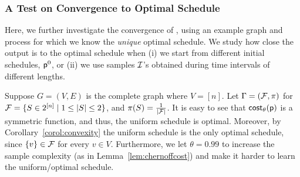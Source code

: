 \begin{table}[ht]
\centering
{}
\end{table}



\subsubsection{A Test on Convergence to  Optimal Schedule}\label{sec:example}
Here, we further investigate the convergence of \algonameapx, using an example
graph and process for which we know the \emph{unique} optimal schedule. We study
how close the \algonameapx output is to the optimal schedule when (i) we start
from different initial schedules, $\mathsf{p}^0$, or (ii) we use samples $\mathcal{I}$'s
obtained during time intervals of different lengths.

Suppose $G=(V,E)$ is the complete graph where $V=[n]$. Let $\Gamma=(\mathcal{F}, \pi)$ for  $\mathcal{F} = \{S \in 2^{[n]} \mid 1 \leq|S| \leq 2\}$, and $\pi(S)=\frac{1}{|\mathcal{F}|}$. It is easy to see that $\mathsf{cost}_\theta(\mathsf{p})$ is a symmetric function, and thus, the uniform schedule is optimal. Moreover, by Corollary~\ref{corol:convexity} the uniform schedule is the only optimal schedule, since $\{v\} \in \mathcal{F}$ for every $v\in V$. Furthermore, we let $\theta=0.99$ to increase the sample complexity (as in Lemma~\ref{lem:chernoffcost}) and make it harder to learn the uniform/optimal schedule.


